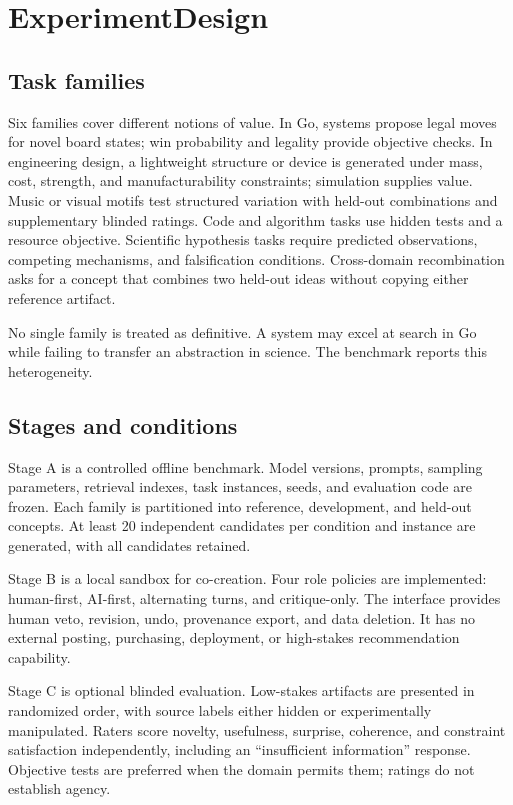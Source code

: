 \documentclass[conference]{IEEEtran}
\begin{document}
\section{ExperimentDesign}
\label{sec:design}

\subsection{Task families}

Six families cover different notions of value. In Go, systems propose legal moves for
novel board states; win probability and legality provide objective checks. In
engineering design, a lightweight structure or device is generated under mass, cost,
strength, and manufacturability constraints; simulation supplies value. Music or visual
motifs test structured variation with held-out combinations and supplementary blinded
ratings. Code and algorithm tasks use hidden tests and a resource objective. Scientific
hypothesis tasks require predicted observations, competing mechanisms, and falsification
conditions. Cross-domain recombination asks for a concept that combines two held-out
ideas without copying either reference artifact.

No single family is treated as definitive. A system may excel at search in Go while
failing to transfer an abstraction in science. The benchmark reports this heterogeneity.

\subsection{Stages and conditions}

Stage A is a controlled offline benchmark. Model versions, prompts, sampling parameters,
retrieval indexes, task instances, seeds, and evaluation code are frozen. Each family is
partitioned into reference, development, and held-out concepts. At least 20 independent
candidates per condition and instance are generated, with all candidates retained.

Stage B is a local sandbox for co-creation. Four role policies are implemented:
human-first, AI-first, alternating turns, and critique-only. The interface provides
human veto, revision, undo, provenance export, and data deletion. It has no external
posting, purchasing, deployment, or high-stakes recommendation capability.

Stage C is optional blinded evaluation. Low-stakes artifacts are presented in randomized
order, with source labels either hidden or experimentally manipulated. Raters score
novelty, usefulness, surprise, coherence, and constraint satisfaction independently,
including an ``insufficient information'' response. Objective tests are preferred when
the domain permits them; ratings do not establish agency.
\end{document}
